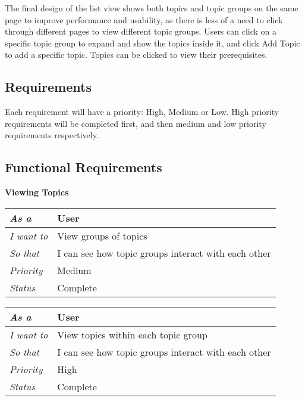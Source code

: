 The final design of the list view shows both topics and topic groups on the same page to improve performance and usability, as there is less of a need to click through different pages to view different topic groups. Users can click on a specific topic group to expand and show the topics inside it, and click Add Topic to add a specific topic. Topics can be clicked to view their prerequisites.

\subsection{Requirements}
Each requirement will have a priority: High, Medium or Low. High priority requirements will be completed first, and then medium and low priority requirements respectively. \\

\subsection{Functional Requirements}

\textbf{Viewing Topics}
\FloatBarrier
\begin{table}[h!]
\begin{tabular}{|l|l|}
\hline
\textit{As a}      & User                                                \\ \hline
\textit{I want to} & View groups of topics                               \\ \hline
\textit{So that}   & I can see how topic groups interact with each other \\ \hline
\textit{Priority}  & {\color[HTML]{FE996B} Medium}                         \\ \hline
\textit{Status}    & Complete                                            \\ \hline
\end{tabular}
\end{table}


\begin{table}[h!]
\begin{tabular}{|l|l|}
\hline
\textit{As a}      & User                                                \\ \hline
\textit{I want to} & View topics within each topic group                 \\ \hline
\textit{So that}   & I can see how topic groups interact with each other \\ \hline
\textit{Priority}  & {\color[HTML]{FE0000} High}                         \\ \hline
\textit{Status}    & Complete                                            \\ \hline
\end{tabular}
\end{table}

